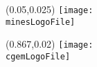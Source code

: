 \documentclass[light]{cgem-presentation}
\begin{document}
  \begin{frame}[plain]
    \begin{figure}
      \begin{textblock*}{1cm}(0.05\paperwidth,0.025\paperheight)
        \texttt{[image: \\minesLogoFile]}
      \end{textblock*}
    \end{figure}
    \begin{figure}
      \begin{textblock*}{1cm}(0.867\paperwidth,0.02\paperheight)
        \texttt{[image: \\cgemLogoFile]}
      \end{textblock*}
    \end{figure}
    \makequestion{-8mm}{-2mm}{1.75cm}{1.82cm}{1mm}
  \end{frame}

  \BibliographyFrame
  \VariableFrame
\end{document}
